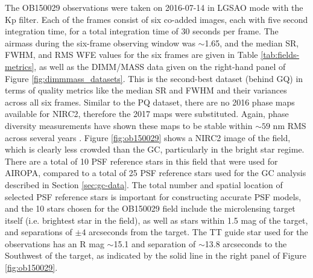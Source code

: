 \documentclass[]{spie}  %
\begin{document}
\indent The OB150029 observations were taken on 2016-07-14 in LGSAO mode with the Kp filter. Each of the frames consist of six co-added images, each with five second integration time, for a total integration time of 30 seconds per frame. The airmass during the six-frame observing window was $\sim$1.65, and the median SR, FWHM, and RMS WFE values for the six frames are given in Table \ref{tab:fields-metrics}, as well as the DIMM/MASS data given on the right-hand panel of Figure \ref{fig:dimmmass_datasets}. This is the second-best dataset (behind GQ) in terms of quality metrics like the median SR and FWHM and their variances across all six frames. Similar to the PQ dataset, there are no 2016 phase maps available for NIRC2, therefore the 2017 maps were substituted. Again, phase diversity measurements have shown these maps to be stable within ${\sim}59$ nm RMS across several years \cite{Ciurlo:inprep}. Figure \ref{fig:ob150029} shows a NIRC2 image of the field, which is clearly less crowded than the GC, particularly in the bright star regime. 
\\
\indent There are a total of 10 PSF reference stars in this field that were used for AIROPA, compared to a total of 25 PSF reference stars used for the GC analysis described in Section \ref{sec:gc-data}. The total number and spatial location of selected PSF reference stars is important for constructing accurate PSF models, and the 10 stars chosen for the OB150029 field include the microlensing target itself (i.e. brightest star in the field), as well as stars within 1.5 mag of the target, and separations of $\pm4$ arcseconds from the target. The TT guide star used for the observations has an R mag ${\sim}$15.1 and separation of ${\sim}$13.8 arcseconds to the Southwest of the target, as indicated by the solid line in the right panel of Figure \ref{fig:ob150029}.

\end{document}
